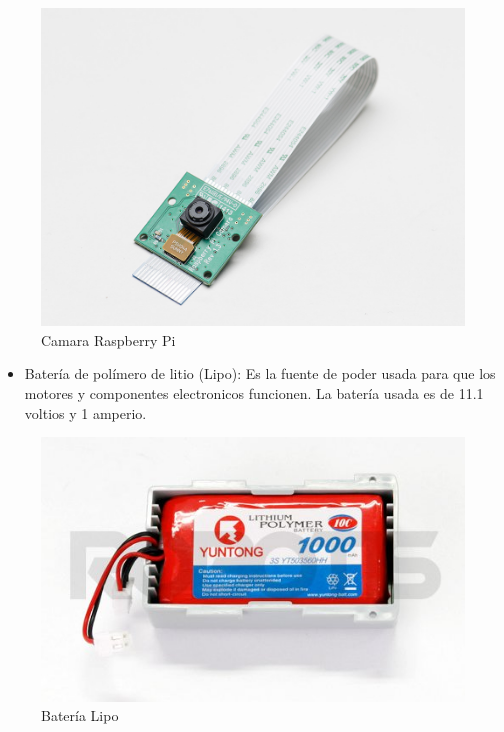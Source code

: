 \begin{figure}[hbtp]
\centering
\label{fig:came}
\includegraphics[scale=0.3]{imagenes/1367-01.jpg}
\caption{Camara Raspberry Pi}
\end{figure}


\begin{itemize}
\item Batería de polímero de litio (Lipo): Es la fuente de poder usada para que los motores y componentes electronicos funcionen. La batería usada es de 11.1 voltios y 1 amperio. \cite{bateria}
\end{itemize}


\begin{figure}[hbtp]
\centering
\includegraphics[scale=0.3]{imagenes/R-LIPOBAT.jpg}
\caption{Batería Lipo}
\end{figure}

